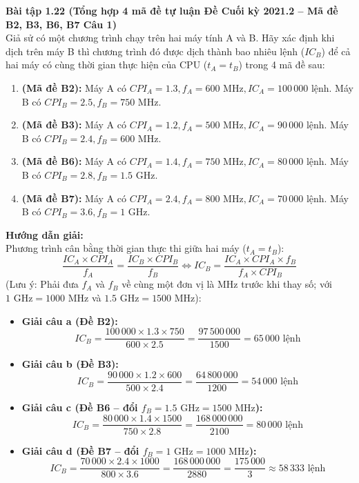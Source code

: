 \textbf{Bài tập 1.22 (Tổng hợp 4 mã đề tự luận Đề Cuối kỳ 2021.2 -- Mã đề B2, B3, B6, B7 Câu 1)}\\
Giả sử có một chương trình chạy trên hai máy tính A và B. Hãy xác định khi dịch trên máy B thì chương trình đó được dịch thành bao nhiêu lệnh ($IC_B$) để cả hai máy có cùng thời gian thực hiện của CPU ($t_A = t_B$) trong 4 mã đề sau:
\begin{enumerate}[label=\alph*)]
    \item \textbf{(Mã đề B2):} Máy A có $CPI_A = 1.3, f_A = 600\text{ MHz}, IC_A = 100\,000\text{ lệnh}$. Máy B có $CPI_B = 2.5, f_B = 750\text{ MHz}$.
    \item \textbf{(Mã đề B3):} Máy A có $CPI_A = 1.2, f_A = 500\text{ MHz}, IC_A = 90\,000\text{ lệnh}$. Máy B có $CPI_B = 2.4, f_B = 600\text{ MHz}$.
    \item \textbf{(Mã đề B6):} Máy A có $CPI_A = 1.4, f_A = 750\text{ MHz}, IC_A = 80\,000\text{ lệnh}$. Máy B có $CPI_B = 2.8, f_B = 1.5\text{ GHz}$.
    \item \textbf{(Mã đề B7):} Máy A có $CPI_A = 2.4, f_A = 800\text{ MHz}, IC_A = 70\,000\text{ lệnh}$. Máy B có $CPI_B = 3.6, f_B = 1\text{ GHz}$.
\end{enumerate}
\textbf{Hướng dẫn giải:}\\
Phương trình cân bằng thời gian thực thi giữa hai máy ($t_A = t_B$):
$$\frac{IC_A \times CPI_A}{f_A} = \frac{IC_B \times CPI_B}{f_B} \iff IC_B = \frac{IC_A \times CPI_A \times f_B}{f_A \times CPI_B}$$
(Lưu ý: Phải đưa $f_A$ và $f_B$ về cùng một đơn vị là MHz trước khi thay số; với $1\text{ GHz} = 1000\text{ MHz}$ và $1.5\text{ GHz} = 1500\text{ MHz}$):
\begin{itemize}
    \item \textbf{Giải câu a (Đề B2):}
    $$IC_B = \frac{100\,000 \times 1.3 \times 750}{600 \times 2.5} = \frac{97\,500\,000}{1500} = 65\,000\text{ lệnh}$$
    \item \textbf{Giải câu b (Đề B3):}
    $$IC_B = \frac{90\,000 \times 1.2 \times 600}{500 \times 2.4} = \frac{64\,800\,000}{1200} = 54\,000\text{ lệnh}$$
    \item \textbf{Giải câu c (Đề B6 -- đổi $f_B = 1.5\text{ GHz} = 1500\text{ MHz}$):}
    $$IC_B = \frac{80\,000 \times 1.4 \times 1500}{750 \times 2.8} = \frac{168\,000\,000}{2100} = 80\,000\text{ lệnh}$$
    \item \textbf{Giải câu d (Đề B7 -- đổi $f_B = 1\text{ GHz} = 1000\text{ MHz}$):}
    $$IC_B = \frac{70\,000 \times 2.4 \times 1000}{800 \times 3.6} = \frac{168\,000\,000}{2880} = \frac{175\,000}{3} \approx 58\,333\text{ lệnh}$$
\end{itemize}

